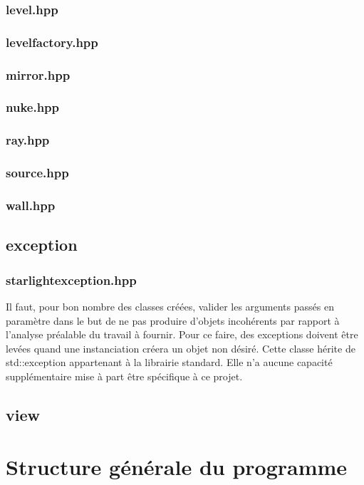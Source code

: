 \documentclass[a4paper,11pt]{report}
\begin{document}
\subsection[Niveau]{level.hpp}
\subsection[Createur de niveau]{levelfactory.hpp}
\subsection[Mirroir]{mirror.hpp}
\subsection[Bombe]{nuke.hpp}
\subsection[Rayon]{ray.hpp}
\subsection[Source]{source.hpp}
\subsection[Mur]{wall.hpp}
\section[L'exception]{exception}
\subsection[Exception Starlight]{starlightexception.hpp}
Il faut, pour bon nombre des classes créées, valider les arguments passés en
paramètre dans le but de ne pas produire d'objets incohérents par rapport à
l'analyse préalable du travail à fournir. Pour ce faire, des exceptions doivent
être levées quand une instanciation créera un objet non désiré. 
Cette classe hérite de std::exception appartenant à la librairie standard. Elle n'a aucune
capacité supplémentaire mise à part être spécifique à ce projet.
\section[Les objets visuels]{view}

\chapter[Structure du programme]{Structure générale du programme}
\end{document}
